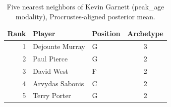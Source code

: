 \begin{table}[htbp]
  \centering\small
  \begin{tabular}{rllc}
    \toprule
    Rank & Player & Position & Archetype \\
    \midrule
    1 & Dejounte Murray & G & 3 \\
    2 & Paul Pierce & G & 2 \\
    3 & David West & F & 2 \\
    4 & Arvydas Sabonis & C & 2 \\
    5 & Terry Porter & G & 2 \\
    \bottomrule
  \end{tabular}
  \caption{Five nearest neighbors of Kevin Garnett (peak_age modality), Procrustes-aligned posterior mean.}
  \label{tab:Kevin_Garnett_neighbors_peak_age}
\end{table}

